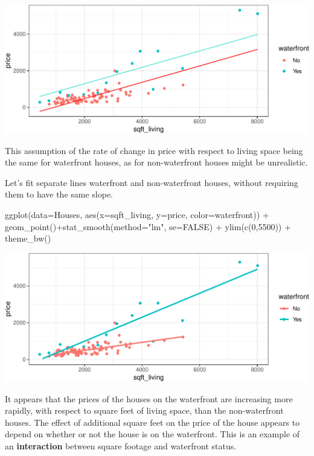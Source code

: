 \documentclass[
  letterpaper,
  DIV=11,
  numbers=noendperiod]{scrreprt}
\newenvironment{Shaded}{\begin{snugshade}}{\end{snugshade}}
\newcommand{\AttributeTok}[1]{\textcolor[rgb]{0.40,0.45,0.13}{#1}}
\newcommand{\ConstantTok}[1]{\textcolor[rgb]{0.56,0.35,0.01}{#1}}
\newcommand{\DecValTok}[1]{\textcolor[rgb]{0.68,0.00,0.00}{#1}}
\newcommand{\FunctionTok}[1]{\textcolor[rgb]{0.28,0.35,0.67}{#1}}
\newcommand{\NormalTok}[1]{\textcolor[rgb]{0.00,0.23,0.31}{#1}}
\newcommand{\SpecialCharTok}[1]{\textcolor[rgb]{0.37,0.37,0.37}{#1}}
\newcommand{\StringTok}[1]{\textcolor[rgb]{0.13,0.47,0.30}{#1}}
\begin{document}
\includegraphics{Ch2_files/figure-pdf/unnamed-chunk-44-1.pdf}

This assumption of the rate of change in price with respect to living
space being the same for waterfront houses, as for non-waterfront houses
might be unrealistic.

Let's fit separate lines waterfront and non-waterfront houses, without
requiring them to have the same slope.

\begin{Shaded}
\begin{Highlighting}[]
\FunctionTok{ggplot}\NormalTok{(}\AttributeTok{data=}\NormalTok{Houses, }\FunctionTok{aes}\NormalTok{(}\AttributeTok{x=}\NormalTok{sqft\_living, }\AttributeTok{y=}\NormalTok{price, }\AttributeTok{color=}\NormalTok{waterfront)) }\SpecialCharTok{+} \FunctionTok{geom\_point}\NormalTok{()}\SpecialCharTok{+}\FunctionTok{stat\_smooth}\NormalTok{(}\AttributeTok{method=}\StringTok{"lm"}\NormalTok{, }\AttributeTok{se=}\ConstantTok{FALSE}\NormalTok{) }\SpecialCharTok{+} \FunctionTok{ylim}\NormalTok{(}\FunctionTok{c}\NormalTok{(}\DecValTok{0}\NormalTok{,}\DecValTok{5500}\NormalTok{)) }\SpecialCharTok{+} \FunctionTok{theme\_bw}\NormalTok{()}
\end{Highlighting}
\end{Shaded}

\includegraphics{Ch2_files/figure-pdf/unnamed-chunk-45-1.pdf}

It appears that the prices of the houses on the waterfront are
increasing more rapidly, with respect to square feet of living space,
than the non-waterfront houses. The effect of additional square feet on
the price of the house appears to depend on whether or not the house is
on the waterfront. This is an example of an \textbf{interaction} between
square footage and waterfront status.
\end{document}
